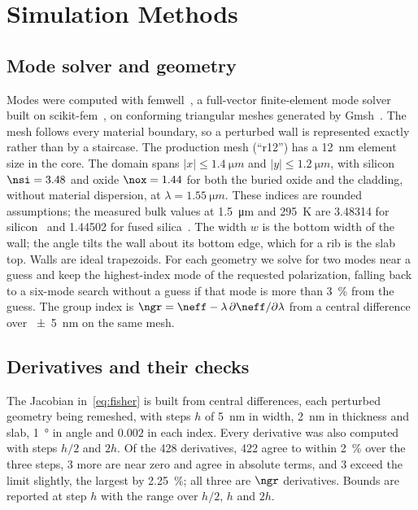\section{Simulation Methods}
\label{sec:methods}

\subsection{Mode solver and geometry}

Modes were computed with femwell~\cite{femwell}, a full-vector finite-element mode solver built on
scikit-fem~\cite{gustafsson2020}, on conforming triangular meshes generated by Gmsh~\cite{geuzaine2009}. The mesh
follows every material boundary, so a perturbed wall is represented exactly rather than by a staircase. The
production mesh (``r12'') has a \qty{12}{nm} element size in the core. The domain spans
$|x|\le\qty{1.4}{\micro m}$ and $|y|\le\qty{1.2}{\micro m}$, with silicon $\nsi=3.48$ and oxide $\nox=1.44$ for both the buried oxide and the
cladding, without material dispersion, at $\lambda=\qty{1.55}{\micro m}$. These indices are rounded assumptions; the
measured bulk values at \qty{1.5}{\micro m} and \qty{295}{K} are \num{3.48314} for silicon~\cite{frey2006} and
\num{1.44502} for fused silica~\cite{leviton2008}. The width $w$ is the bottom width of the wall; the angle tilts the
wall about its bottom edge, which for a rib is the slab top. Walls are ideal trapezoids. For each geometry we solve for
two modes near a guess and keep the highest-index mode of the requested polarization, falling back to a six-mode search
without a guess if that mode is more than \qty{3}{\percent} from the guess. The group index is
$\ngr=\neff-\lambda\,\partial\neff/\partial\lambda$ from a central difference over \qty{\pm 5}{nm} on the same mesh.

\subsection{Derivatives and their checks}

The Jacobian in~\eqref{eq:fisher} is built from central differences, each perturbed geometry being remeshed, with
steps $h$ of \qty{5}{nm} in width, \qty{2}{nm} in thickness and slab, \qty{1}{\degree} in angle and $0.002$ in each
index. Every derivative was also computed with steps $h/2$ and $2h$. Of the 428 derivatives, 422 agree to within
\qty{2}{\percent} over the three steps, 3 more are near zero and agree in absolute terms, and 3 exceed the limit
slightly, the largest by \qty{2.25}{\percent}; all three are $\ngr$ derivatives. Bounds are reported at step $h$ with
the range over $h/2$, $h$ and $2h$.

